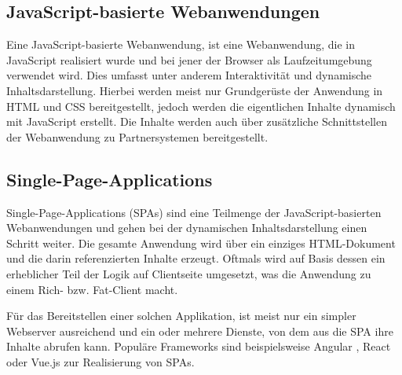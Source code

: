 


\subsection{JavaScript-basierte Webanwendungen}

Eine JavaScript-basierte Webanwendung, ist eine Webanwendung, die in JavaScript realisiert wurde und bei jener der Browser als Laufzeitumgebung verwendet wird. Dies umfasst unter anderem Interaktivität und dynamische Inhaltsdarstellung. Hierbei werden meist nur Grundgerüste der Anwendung in HTML und CSS bereitgestellt, jedoch werden die eigentlichen Inhalte dynamisch mit JavaScript erstellt. Die Inhalte werden auch über zusätzliche Schnittstellen der Webanwendung zu Partnersystemen bereitgestellt.

\subsection{Single-Page-Applications}
\label{subsec:singe-page-applications}

Single-Page-Applications (SPAs) sind eine Teilmenge der JavaScript-basierten Webanwendungen und gehen bei der dynamischen Inhaltsdarstellung einen Schritt weiter. Die gesamte Anwendung wird über ein einziges HTML-Dokument und die darin referenzierten Inhalte erzeugt. Oftmals wird auf Basis dessen ein erheblicher Teil der Logik auf Clientseite umgesetzt, was die Anwendung zu einem Rich- bzw. Fat-Client macht.

Für das Bereitstellen einer solchen Applikation, ist meist nur ein simpler Webserver ausreichend und ein oder mehrere Dienste, von dem aus die SPA ihre Inhalte abrufen kann. Populäre Frameworks sind beispielsweise Angular \cite{AngularHomepage}, React \cite{ReactHomepage} oder Vue.js \cite{VueJSHomepage} zur Realisierung von SPAs.

